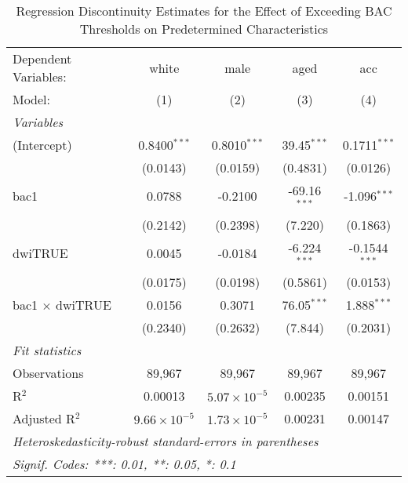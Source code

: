\begin{table}[htbp]
   \centering
   \caption{Regression Discontinuity Estimates for the Effect of Exceeding BAC Thresholds on Predetermined Characteristics}
   \begin{tabular}{lcccc}
      \tabularnewline\midrule\midrule
      Dependent Variables:   & white                 & male                  & aged           & acc\\
      Model:                 & (1)                   & (2)                   & (3)            & (4)\\
      \midrule \emph{Variables} &   &   &   &  \\
      (Intercept)            & 0.8400$^{***}$        & 0.8010$^{***}$        & 39.45$^{***}$  & 0.1711$^{***}$\\
                             & (0.0143)              & (0.0159)              & (0.4831)       & (0.0126)\\
      bac1                   & 0.0788                & -0.2100               & -69.16$^{***}$ & -1.096$^{***}$\\
                             & (0.2142)              & (0.2398)              & (7.220)        & (0.1863)\\
      dwiTRUE                & 0.0045                & -0.0184               & -6.224$^{***}$ & -0.1544$^{***}$\\
                             & (0.0175)              & (0.0198)              & (0.5861)       & (0.0153)\\
      bac1 $\times$ dwiTRUE & 0.0156                & 0.3071                & 76.05$^{***}$  & 1.888$^{***}$\\
                             & (0.2340)              & (0.2632)              & (7.844)        & (0.2031)\\
      \midrule \emph{Fit statistics} &   &   &   &  \\
      Observations           & 89,967                & 89,967                & 89,967         & 89,967\\
      R$^2$                  & 0.00013               & $5.07\times 10^{-5}$ & 0.00235        & 0.00151\\
      Adjusted R$^2$         & $9.66\times 10^{-5}$ & $1.73\times 10^{-5}$ & 0.00231        & 0.00147\\
      \midrule\midrule\multicolumn{5}{l}{\emph{Heteroskedasticity-robust standard-errors in parentheses}}\\
      \multicolumn{5}{l}{\emph{Signif. Codes: ***: 0.01, **: 0.05, *: 0.1}}\\
   \end{tabular}
\end{table}


